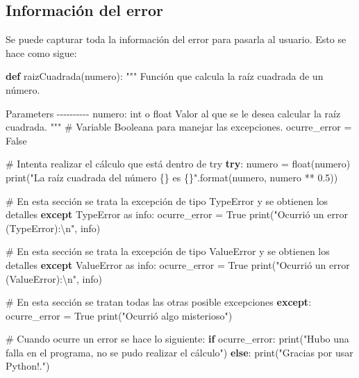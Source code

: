 \documentclass[
  spanish,
  letterpaper,
]{scrbook}
\newenvironment{Shaded}{\begin{snugshade}}{\end{snugshade}}
\newcommand{\BuiltInTok}[1]{\textcolor[rgb]{0.00,0.23,0.31}{#1}}
\newcommand{\CharTok}[1]{\textcolor[rgb]{0.13,0.47,0.30}{#1}}
\newcommand{\CommentTok}[1]{\textcolor[rgb]{0.37,0.37,0.37}{#1}}
\newcommand{\ControlFlowTok}[1]{\textcolor[rgb]{0.00,0.23,0.31}{\textbf{#1}}}
\newcommand{\FloatTok}[1]{\textcolor[rgb]{0.68,0.00,0.00}{#1}}
\newcommand{\ImportTok}[1]{\textcolor[rgb]{0.00,0.46,0.62}{#1}}
\newcommand{\KeywordTok}[1]{\textcolor[rgb]{0.00,0.23,0.31}{\textbf{#1}}}
\newcommand{\NormalTok}[1]{\textcolor[rgb]{0.00,0.23,0.31}{#1}}
\newcommand{\OperatorTok}[1]{\textcolor[rgb]{0.37,0.37,0.37}{#1}}
\newcommand{\PreprocessorTok}[1]{\textcolor[rgb]{0.68,0.00,0.00}{#1}}
\newcommand{\SpecialCharTok}[1]{\textcolor[rgb]{0.37,0.37,0.37}{#1}}
\newcommand{\StringTok}[1]{\textcolor[rgb]{0.13,0.47,0.30}{#1}}
\newcommand{\VariableTok}[1]{\textcolor[rgb]{0.07,0.07,0.07}{#1}}
\theoremstyle{definition}
\theoremstyle{remark}
\begin{document}
\subsection{Información del error}\label{informaciuxf3n-del-error}

Se puede capturar toda la información del error para pasarla al usuario.
Esto se hace como sigue:

\begin{Shaded}
\begin{Highlighting}[]
\KeywordTok{def}\NormalTok{ raizCuadrada(numero): }
    \CommentTok{"""}
\CommentTok{    Función que calcula la raíz cuadrada de un número.}

\CommentTok{    Parameters}
\CommentTok{    {-}{-}{-}{-}{-}{-}{-}{-}{-}{-}}
\CommentTok{    numero: int o float}
\CommentTok{        Valor al que se le desea calcular la raíz cuadrada.}
\CommentTok{    }
\CommentTok{    """}
    \CommentTok{\# Variable Booleana para manejar las excepciones.}
\NormalTok{    ocurre\_error }\OperatorTok{=} \VariableTok{False}
    
    \CommentTok{\# Intenta realizar el cálculo que está dentro de try}
    \ControlFlowTok{try}\NormalTok{:}
\NormalTok{        numero }\OperatorTok{=} \BuiltInTok{float}\NormalTok{(numero)}
        \BuiltInTok{print}\NormalTok{(}\StringTok{"La raíz cuadrada del número }\SpecialCharTok{\{\}}\StringTok{ es }\SpecialCharTok{\{\}}\StringTok{"}\NormalTok{.}\BuiltInTok{format}\NormalTok{(numero, numero }\OperatorTok{**} \FloatTok{0.5}\NormalTok{))}

    \CommentTok{\# En esta sección se trata la excepción de tipo TypeError y se obtienen los detalles  }
    \ControlFlowTok{except} \PreprocessorTok{TypeError} \ImportTok{as}\NormalTok{ info:}
\NormalTok{        ocurre\_error }\OperatorTok{=} \VariableTok{True}
        \BuiltInTok{print}\NormalTok{(}\StringTok{"Ocurrió un error (TypeError):}\CharTok{\textbackslash{}n}\StringTok{"}\NormalTok{, info)}

    \CommentTok{\# En esta sección se trata la excepción de tipo ValueError y se obtienen los detalles  }
    \ControlFlowTok{except} \PreprocessorTok{ValueError} \ImportTok{as}\NormalTok{ info:}
\NormalTok{        ocurre\_error }\OperatorTok{=} \VariableTok{True}
        \BuiltInTok{print}\NormalTok{(}\StringTok{"Ocurrió un error (ValueError):}\CharTok{\textbackslash{}n}\StringTok{"}\NormalTok{, info)}

    \CommentTok{\# En esta sección se tratan todas las otras posible excepciones}
    \ControlFlowTok{except}\NormalTok{:}
\NormalTok{        ocurre\_error }\OperatorTok{=} \VariableTok{True}
        \BuiltInTok{print}\NormalTok{(}\StringTok{"Ocurrió algo misterioso"}\NormalTok{)}

    \CommentTok{\# Cuando ocurre un error se hace lo siguiente:}
    \ControlFlowTok{if}\NormalTok{ ocurre\_error:}
        \BuiltInTok{print}\NormalTok{(}\StringTok{"Hubo una falla en el programa, no se pudo realizar el cálculo"}\NormalTok{)}
    \ControlFlowTok{else}\NormalTok{:}
        \BuiltInTok{print}\NormalTok{(}\StringTok{"Gracias por usar Python!."}\NormalTok{)}
\end{Highlighting}
\end{Shaded}
\end{document}
